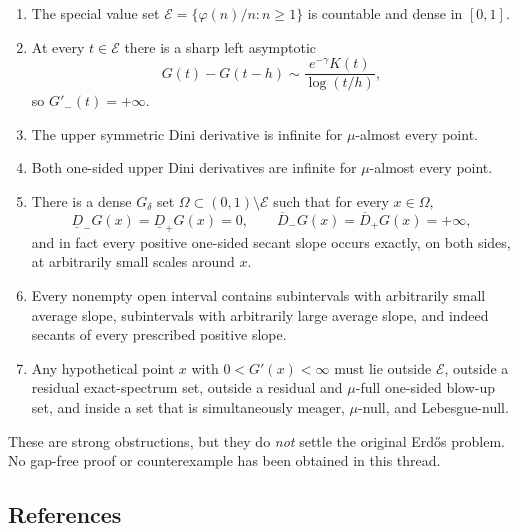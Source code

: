 \begin{enumerate}
\item The special value set $\mathcal E=\{\varphi(n)/n:n\ge1\}$ is countable and dense in $[0,1]$.
\item At every $t\in\mathcal E$ there is a sharp left asymptotic
\[
G(t)-G(t-h)\sim \frac{e^{-\gamma}K(t)}{\log(t/h)},
\]
so $G'_-(t)=+\infty$.
\item The upper symmetric Dini derivative is infinite for $\mu$-almost every point.
\item Both one-sided upper Dini derivatives are infinite for $\mu$-almost every point.
\item There is a dense $G_\delta$ set $\Omega\subset(0,1)\setminus\mathcal E$ such that for every $x\in\Omega$,
\[
\underline D_-G(x)=\underline D_+G(x)=0,
\qquad
\overline D_-G(x)=\overline D_+G(x)=+\infty,
\]
and in fact every positive one-sided secant slope occurs exactly, on both sides, at arbitrarily small scales around $x$.
\item Every nonempty open interval contains subintervals with arbitrarily small average slope, subintervals with arbitrarily large average slope, and indeed secants of every prescribed positive slope.
\item Any hypothetical point $x$ with $0<G'(x)<\infty$ must lie outside $\mathcal E$, outside a residual exact-spectrum set, outside a residual and $\mu$-full one-sided blow-up set, and inside a set that is simultaneously meager, $\mu$-null, and Lebesgue-null.
\end{enumerate}

These are strong obstructions, but they do \emph{not} settle the original Erd\H{o}s problem. No gap-free proof or counterexample has been obtained in this thread.

\subsection{References}

